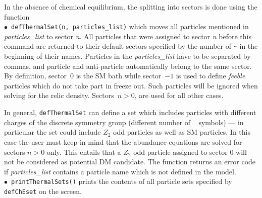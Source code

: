 \documentclass[12pt,a4paper]{article}
\begin{document}



In the absence of chemical equilibrium, the splitting into sectors is done using 
 the function
\\
$\bullet$~\verb|defThermalSet(n, particles_list)| 
 which moves all particles mentioned in {\it  particles\_list } to sector {\it n}. All
particles that were assigned to sector {\it n}  before this command are returned to their default sectors
specified by the number of  \verb|~| in the beginning of their names.
Particles in the {\it particles\_list} have to be separated by commas, and particle and anti-particle
automatically belong to the same sector.  By definition, sector~$0$ is the SM bath while 
sector~$-1$ is used to define {\it feeble} particles which do not take part in freeze out. Such particles will be ignored when solving for the relic density. 
Sectors~$n>0$, are used for all other cases. 


In general, \verb|defThermalSet| can define a set which includes particles with different
charges of the discrete symmetry group (different number of ~ symbols) — in particular
the set could include $Z_2$ odd particles as well as SM particles. In this case the user
must keep in mind that the abundance equations are solved for sectors $n > 0$ only. This
entails that a $Z_2$ odd particle assigned to sector 0 will not be considered as potential DM
candidate. The function returns an error code if {\it particles\_list} contains a particle name
which is not defined in the model.
\\
$\bullet$~\verb|printThermalSets()| prints the contents of all particle sets specified by \verb|defChEset| on the screen. 
\end{document}
